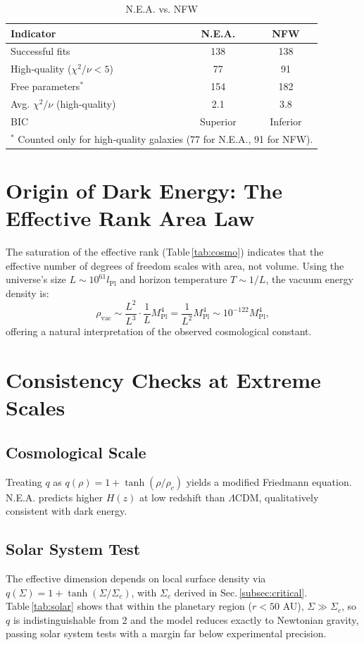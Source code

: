 \documentclass[12pt,a4paper]{article}
\begin{document}
\begin{table}[htbp]
\centering
\caption{N.E.A. vs. NFW}
\label{tab:nfw_compare}
\begin{tabular}{lcc}
\toprule
\textbf{Indicator} & \textbf{N.E.A.} & \textbf{NFW} \\
\midrule
Successful fits & 138 & 138 \\
High‑quality ($\chi^2/\nu<5$) & 77 & 91 \\
Free parameters$^*$ & 154 & 182 \\
Avg. $\chi^2/\nu$ (high‑quality) & 2.1 & 3.8 \\
BIC & Superior & Inferior \\
\bottomrule
\multicolumn{3}{l}{\footnotesize $^*$ Counted only for high‑quality galaxies (77 for N.E.A., 91 for NFW).}
\end{tabular}
\end{table}

\section{Origin of Dark Energy: The Effective Rank Area Law}
\label{sec:darkenergy}
The saturation of the effective rank (Table \ref{tab:cosmo}) indicates that the effective number of degrees of freedom scales with area, not volume. Using the universe’s size $L\sim 10^{61}l_{\text{Pl}}$ and horizon temperature $T\sim 1/L$, the vacuum energy density is:
\[
\rho_{\text{vac}} \sim \frac{L^2}{L^3} \cdot \frac{1}{L} M_{\text{Pl}}^4 = \frac{1}{L^2} M_{\text{Pl}}^4 \sim 10^{-122} M_{\text{Pl}}^4,
\]
offering a natural interpretation of the observed cosmological constant.

\section{Consistency Checks at Extreme Scales}
\subsection{Cosmological Scale}
Treating $q$ as $q(\rho)=1+\tanh(\rho/\rho_c)$ yields a modified Friedmann equation. N.E.A. predicts higher $H(z)$ at low redshift than $\Lambda$CDM, qualitatively consistent with dark energy.

\subsection{Solar System Test}
The effective dimension depends on local surface density via $q(\Sigma)=1+\tanh(\Sigma/\Sigma_c)$, with $\Sigma_c$ derived in Sec. \ref{subsec:critical}. Table \ref{tab:solar} shows that within the planetary region ($r<50$ AU), $\Sigma\gg\Sigma_c$, so $q$ is indistinguishable from 2 and the model reduces exactly to Newtonian gravity, passing solar system tests with a margin far below experimental precision.
\end{document}
